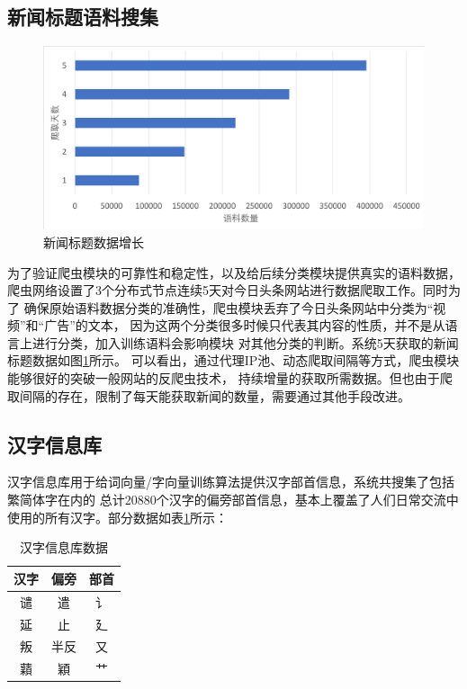 \documentclass{standalone}
\begin{document}
\subsection{新闻标题语料搜集}
\begin{figure}[!hbp]
    \includegraphics[scale=0.45]{picture/spider_data.png}
    \caption{新闻标题数据增长}
    \label{spider_data_chart}
\end{figure}
为了验证爬虫模块的可靠性和稳定性，以及给后续分类模块提供真实的语料数据，
爬虫网络设置了3个分布式节点连续5天对今日头条网站进行数据爬取工作。同时为了
确保原始语料数据分类的准确性，爬虫模块丢弃了今日头条网站中分类为“视频”和“广告”的文本，
因为这两个分类很多时候只代表其内容的性质，并不是从语言上进行分类，加入训练语料会影响模块
对其他分类的判断。系统5天获取的新闻标题数据如图\ref{spider_data_chart}所示。
可以看出，通过代理IP池、动态爬取间隔等方式，爬虫模块能够很好的突破一般网站的反爬虫技术，
持续增量的获取所需数据。但也由于爬取间隔的存在，限制了每天能获取新闻的数量，需要通过其他手段改进。
\subsection{汉字信息库}
汉字信息库用于给词向量/字向量训练算法提供汉字部首信息，系统共搜集了包括繁简体字在内的
总计20880个汉字的偏旁部首信息，基本上覆盖了人们日常交流中使用的所有汉字。部分数据如表\ref{comp_table}所示：
\begin{table}[h]
    \caption{汉字信息库数据}
    \begin{tabular}{|c|c|c|}
        \hline
        汉字 & 偏旁 & 部首 \\
        \hline
        谴 & 遣 & 讠 \\
        \hline
        延 & 止 & 廴 \\
        \hline
        叛 & 半反 & 又 \\
        \hline
        蘔 & 穎 & 艹 \\
        \hline
    \end{tabular}
    \label{comp_table}
    \end{table}
\end{document}
